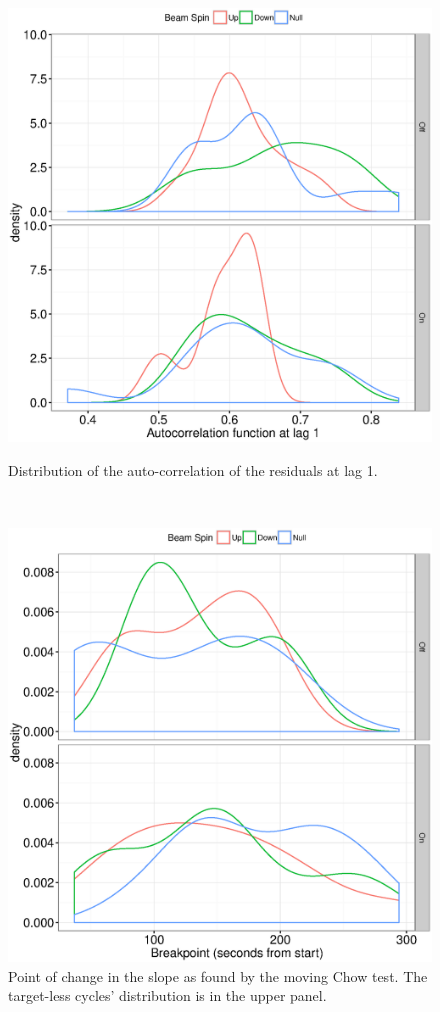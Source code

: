 \documentclass{article}
\begin{document}
\begin{figure}[h]
	\centering
	\begin{minipage}{.5\textwidth}
		\centering
		\includegraphics[scale=.5]{ACF1_dens.eps}
		\caption{Distribution of the auto-correlation of the residuals at lag 1.\label{fig:DW2}}
	\end{minipage}~~
	\begin{minipage}{.5\textwidth}
		\centering
		\includegraphics[scale=.5]{FStats_BP_dens.eps}
		\caption{Point of change in the slope as found by the moving Chow test. The target-less cycles' distribution is in the upper panel.\label{FStat_BP_dens}}
	\end{minipage}
\end{figure}
\end{document}
